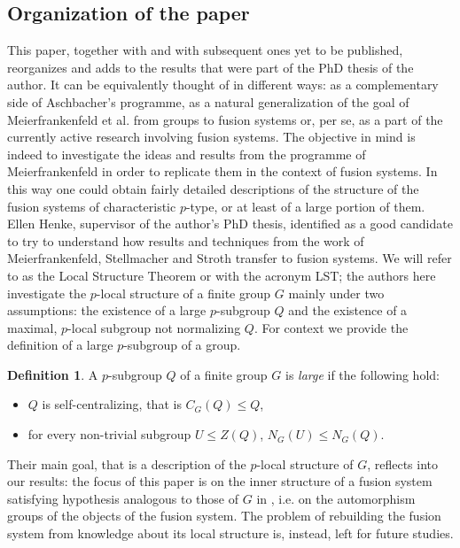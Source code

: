 \documentclass{amsart}
\numberwithin{equation}{section}
\theoremstyle{definition}
\newtheorem{definition}[equation]{Definition}
\theoremstyle{subresult}
\theoremstyle{caseresult}
\newcommand{\<}{\langle}
\renewcommand{\>}{\rangle}
\begin{document}
\subsection{Organization of the paper}
This paper, together with \cite{Henke-Salati:2026} and with subsequent ones yet to be published, reorganizes and adds to the results that were part of the PhD thesis of the author. It can be equivalently thought of in different ways: as a complementary side of Aschbacher's programme, as a natural generalization of the goal of Meierfrankenfeld et al. from groups to fusion systems or, per se, as a part of the currently active research involving fusion systems. The objective in mind is indeed to investigate the ideas and results from the programme of Meierfrankenfeld in order to replicate them in the context of fusion systems. In this way one could obtain fairly detailed descriptions of the structure of the fusion systems of characteristic $p$-type, or at least of a large portion of them. \\
Ellen Henke, supervisor of the author's PhD thesis, identified \cite[Theorem A]{Meier-Stell-Stroth:2012} as a good candidate to try to understand how results and techniques from the work of Meierfrankenfeld, Stellmacher and Stroth transfer to fusion systems. We will refer to \cite{Meier-Stell-Stroth:2012} as the Local Structure Theorem or with the acronym LST; the authors here investigate the $p$-local structure of a finite group $G$ mainly under two assumptions: the existence of a large $p$-subgroup $Q$ and the existence of a maximal, $p$-local subgroup not normalizing $Q$. For context we provide the definition of a large $p$-subgroup of a group.
\begin{definition}
	\label{def: large subgroup of a group}
	A $p$-subgroup $Q$ of a finite group $G$ is \emph{large} if the following hold:
	\begin{itemize}
		\item[$(SC)$] $Q$ is self-centralizing, that is $C_G(Q) \le Q$,
		\item[$(Q!)$] for every non-trivial subgroup $U \le Z(Q)$, $N_G(U) \le N_G(Q)$.
	\end{itemize}
\end{definition}
Their main goal, that is a description of the $p$-local structure of $G$, reflects into our results: the focus of this paper is on the inner structure of a fusion system satisfying hypothesis analogous to those of $G$ in \cite[Theorem A]{Meier-Stell-Stroth:2012}, i.e. on the automorphism groups of the objects of the fusion system. The problem of rebuilding the fusion system from knowledge about its local structure is, instead, left for future studies.\\
\end{document}
